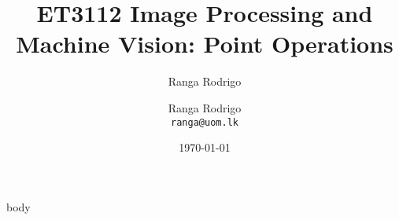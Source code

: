 \documentclass[t, aspectratio=169,xcolor={svgnames}, 10pt, handout]{beamer}
\title{ET3112 Image Processing and Machine Vision: Point Operations}
\author{Ranga Rodrigo}
\author[]{Ranga Rodrigo\\ \texttt{ranga@uom.lk}}
\institute[]{The University of Moratuwa, Sri Lanka}
\date{\today}
\begin{document}
    \begin{frame}
        \titlepage
    \end{frame}


    {body}
\end{document}
